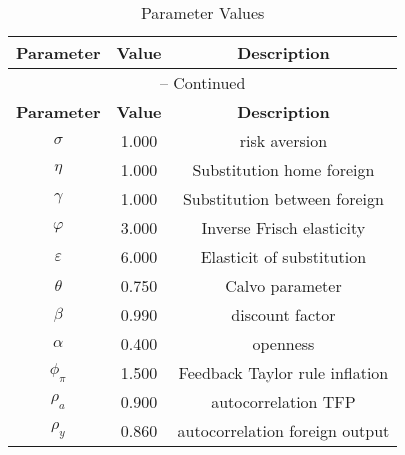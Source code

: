 \begin{center}
\begin{longtable}{ccc}
\caption{Parameter Values}\\%
\toprule%
\multicolumn{1}{c}{\textbf{Parameter}} &
\multicolumn{1}{c}{\textbf{Value}} &
 \multicolumn{1}{c}{\textbf{Description}}\\%
\midrule%
\endfirsthead
\multicolumn{3}{c}{{\tablename} \thetable{} -- Continued}\\%
\midrule%
\multicolumn{1}{c}{\textbf{Parameter}} &
\multicolumn{1}{c}{\textbf{Value}} &
  \multicolumn{1}{c}{\textbf{Description}}\\%
\midrule%
\endhead
$\sigma$ 	 & 	 1.000 	 & 	 risk aversion\\
$\eta$ 	 & 	 1.000 	 & 	 Substitution home foreign\\
$\gamma$ 	 & 	 1.000 	 & 	 Substitution between foreign\\
$\varphi$ 	 & 	 3.000 	 & 	 Inverse Frisch elasticity\\
$\varepsilon$ 	 & 	 6.000 	 & 	 Elasticit of substitution\\
$\theta$ 	 & 	 0.750 	 & 	 Calvo parameter\\
$\beta$ 	 & 	 0.990 	 & 	 discount factor\\
$\alpha$ 	 & 	 0.400 	 & 	 openness\\
$\phi_\pi$ 	 & 	 1.500 	 & 	 Feedback Taylor rule inflation\\
$\rho_a$ 	 & 	 0.900 	 & 	 autocorrelation TFP\\
$\rho_y$ 	 & 	 0.860 	 & 	 autocorrelation foreign output\\
\bottomrule%
\end{longtable}
\end{center}
